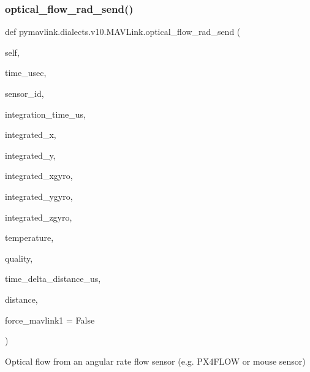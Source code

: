 \begin{DoxyVerb}
\begin{DoxyVerb}
\begin{DoxyVerb}
\begin{DoxyVerb}
\subsubsection{\texorpdfstring{optical\+\_\+flow\+\_\+rad\+\_\+send()}{optical\_flow\_rad\_send()}}
{\footnotesize\ttfamily def pymavlink.\+dialects.\+v10.\+M\+A\+V\+Link.\+optical\+\_\+flow\+\_\+rad\+\_\+send (\begin{DoxyParamCaption}\item[{}]{self,  }\item[{}]{time\+\_\+usec,  }\item[{}]{sensor\+\_\+id,  }\item[{}]{integration\+\_\+time\+\_\+us,  }\item[{}]{integrated\+\_\+x,  }\item[{}]{integrated\+\_\+y,  }\item[{}]{integrated\+\_\+xgyro,  }\item[{}]{integrated\+\_\+ygyro,  }\item[{}]{integrated\+\_\+zgyro,  }\item[{}]{temperature,  }\item[{}]{quality,  }\item[{}]{time\+\_\+delta\+\_\+distance\+\_\+us,  }\item[{}]{distance,  }\item[{}]{force\+\_\+mavlink1 = {\ttfamily False} }\end{DoxyParamCaption})}

\begin{DoxyVerb}Optical flow from an angular rate flow sensor (e.g. PX4FLOW or mouse
sensor)


\end{DoxyVerb}
\end{DoxyVerb}
\end{DoxyVerb}
\end{DoxyVerb}
\end{DoxyVerb}
